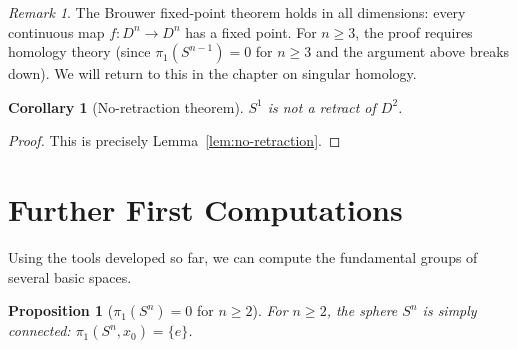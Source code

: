 \documentclass[12pt,a4paper,openany]{book}
\theoremstyle{definition}
\theoremstyle{plain}
\newtheorem{proposition}[definition]{Proposition}
\newtheorem{corollary}[definition]{Corollary}
\theoremstyle{remark}
\newtheorem{remark}[definition]{Remark}
\begin{document}
\begin{center}
\label{fig:brouwer-proof}
\end{center}

\begin{remark}\label{rem:brouwer-higher}
The Brouwer fixed-point theorem holds in all dimensions: every continuous map
$f \colon D^n \to D^n$ has a fixed point. For $n \ge 3$, the proof requires
homology theory (since $\pi_1(S^{n-1}) = 0$ for $n \ge 3$ and the argument
above breaks down). We will return to this in the chapter on singular homology.
\end{remark}

\begin{corollary}[No-retraction theorem]\label{cor:no-retract-general}
$S^1$ is not a retract of $D^2$.
\end{corollary}

\begin{proof}
This is precisely Lemma~\ref{lem:no-retraction}.
\end{proof}


\section{Further First Computations}\label{sec:first-computations}

Using the tools developed so far, we can compute the fundamental groups of
several basic spaces.

\begin{proposition}[$\pi_1(S^n) = 0$ for $n \ge 2$]\label{prop:pi1-Sn}
For $n \ge 2$, the sphere $S^n$ is simply connected: $\pi_1(S^n, x_0) = \{e\}$.
\end{proposition}
\end{document}
